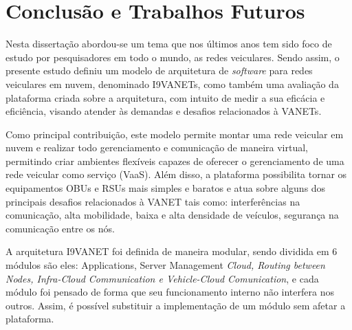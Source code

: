 \documentclass[
	12pt,				%
	oneside,			%
	a4paper,			%
	english,			%
	brazil				%
	]{abntex2ppgsi}
\begin{document}


\chapter{Conclusão e Trabalhos Futuros}\label{sec:conclusao}

Nesta dissertação abordou-se um tema que nos últimos anos tem sido foco de estudo por pesquisadores em todo o mundo, as redes veiculares. Sendo assim, o presente estudo definiu um modelo de  arquitetura de \textit{software} para redes veiculares em nuvem, denominado I9VANETs, como também uma avaliação da plataforma criada sobre a arquitetura, com intuito de medir a sua eficácia e eficiência, visando atender às demandas e desafios relacionados à VANETs. 

Como principal contribuição, este modelo permite montar uma rede veicular em nuvem e realizar todo gerenciamento e comunicação de maneira virtual, permitindo criar ambientes flexíveis capazes de oferecer o gerenciamento de uma rede veicular como serviço (VaaS). Além disso, a plataforma possibilita tornar os equipamentos OBUs e RSUs mais simples e baratos e atua sobre alguns dos principais desafios relacionados à VANET tais como: interferências na comunicação, alta mobilidade, baixa e alta densidade de veículos, segurança na comunicação entre os nós. 


A arquitetura I9VANET foi definida de maneira modular, sendo dividida em 6 módulos são eles: Applications, Server Management \textit{Cloud, Routing between Nodes, Infra-Cloud Communication e Vehicle-Cloud Comunication}, e cada módulo foi pensado de forma que seu funcionamento interno não interfera nos outros. Assim, é possível substituir a implementação de um módulo sem afetar a plataforma.
\end{document}
